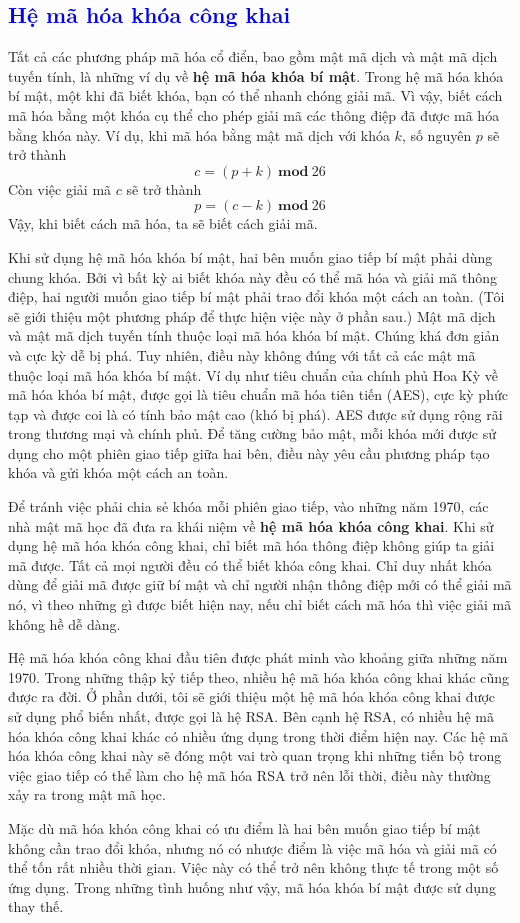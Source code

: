 \textcolor{blue}{\section{Hệ mã hóa khóa công khai}}
Tất cả các phương pháp mã hóa cổ điển, bao gồm mật mã dịch và mật mã dịch tuyến tính, là những ví dụ về \textbf{hệ mã hóa khóa bí mật}. Trong hệ mã hóa khóa bí mật, một khi đã biết khóa, bạn có thể nhanh chóng giải mã. Vì vậy, biết cách mã hóa bằng một khóa cụ thể cho phép giải mã các thông điệp đã được mã hóa bằng khóa này. Ví dụ, khi mã hóa bằng mật mã dịch với khóa $k$, số nguyên $p$ sẽ trở thành
$$c = (p+k)\ \mathbf{mod}\ 26$$
Còn việc giải mã $c$ sẽ trở thành
$$p = (c-k)\ \mathbf{mod}\ 26$$
Vậy, khi biết cách mã hóa, ta sẽ biết cách giải mã.

Khi sử dụng hệ mã hóa khóa bí mật, hai bên muốn giao tiếp bí mật phải dùng chung khóa.
Bởi vì bất kỳ ai biết khóa này đều có thể mã hóa và giải mã thông điệp, hai người muốn giao tiếp bí mật phải trao đổi khóa một cách an toàn.
(Tôi sẽ giới thiệu một phương pháp để thực hiện việc này ở phần sau.)
Mật mã dịch và mật mã dịch tuyến tính thuộc loại mã hóa khóa bí mật. Chúng khá đơn giản và cực kỳ dễ bị phá.
Tuy nhiên, điều này không đúng với tất cả các mật mã thuộc loại mã hóa khóa bí mật.
Ví dụ như tiêu chuẩn của chính phủ Hoa Kỳ về mã hóa khóa bí mật, được gọi là tiêu chuẩn mã hóa tiên tiến (AES), cực kỳ
phức tạp và được coi là có tính bảo mật cao (khó bị phá).
AES được sử dụng rộng rãi trong thương mại và chính phủ.
Để tăng cường bảo mật, mỗi khóa mới được sử dụng cho một phiên giao tiếp giữa hai bên, điều này yêu cầu phương pháp tạo khóa và gửi khóa một cách an toàn.

Để tránh việc phải chia sẻ khóa mỗi phiên giao tiếp, vào những năm 1970, các nhà mật mã học đã đưa ra khái niệm về \textbf{hệ mã hóa khóa công khai}.
Khi sử dụng hệ mã hóa khóa công khai, chỉ biết mã hóa thông điệp không giúp ta giải mã được. Tất cả mọi người đều có thể biết khóa công khai.
Chỉ duy nhất khóa dùng để giải mã được giữ bí mật và chỉ người nhận thông điệp mới có thể giải mã nó,
vì theo những gì được biết hiện nay, nếu chỉ biết cách mã hóa thì việc giải mã không hề dễ dàng.

Hệ mã hóa khóa công khai đầu tiên được phát minh vào khoảng giữa những năm 1970. Trong những thập kỷ tiếp theo,
nhiều hệ mã hóa khóa công khai khác cũng được ra đời. Ở phần dưới, tôi sẽ giới thiệu một hệ mã hóa khóa công khai được sử dụng phổ biến nhất, được gọi là hệ RSA.
Bên cạnh hệ RSA, có nhiều hệ mã hóa khóa công khai khác có nhiều ứng dụng trong thời điểm hiện nay.
Các hệ mã hóa khóa công khai này sẽ đóng một vai trò quan trọng khi những tiến bộ trong việc giao tiếp có thể làm cho hệ mã hóa RSA trở nên lỗi thời, điều này thường xảy ra trong mật mã học.

Mặc dù mã hóa khóa công khai có ưu điểm là hai bên muốn giao tiếp bí mật không cần trao đổi khóa, nhưng nó có nhược điểm là việc mã hóa và giải mã có thể tốn rất nhiều thời gian.
Việc này có thể trở nên không thực tế trong một số ứng dụng. Trong những tình huống như vậy, mã hóa khóa bí mật được sử dụng thay thế.